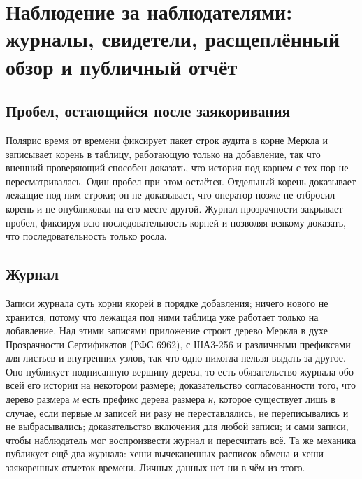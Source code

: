 \section{Наблюдение за наблюдателями: журналы, свидетели, расщеплённый обзор и публичный отчёт}
\label{sec:transparency}



\subsection{Пробел, остающийся после заякоривания}

Полярис время от времени фиксирует пакет строк аудита в корне Меркла и записывает корень в
таблицу, работающую только на добавление, так что внешний проверяющий способен доказать, что
история под корнем с тех пор не пересматривалась. Один пробел при этом остаётся. Отдельный корень
доказывает лежащие под ним строки; он не доказывает, что оператор позже не отбросил корень и не
опубликовал на его месте другой. Журнал прозрачности закрывает пробел, фиксируя всю
последовательность корней и позволяя всякому доказать, что последовательность только росла.
\sImpl

\subsection{Журнал}

Записи журнала суть корни якорей в порядке добавления; ничего нового не хранится, потому что
лежащая под ними таблица уже работает только на добавление. Над этими записями приложение строит
дерево Меркла в духе Прозрачности Сертификатов (РФС 6962), с ША3-256 и различными префиксами для
листьев и внутренних узлов, так что одно никогда нельзя выдать за другое. Оно публикует
подписанную вершину дерева, то есть обязательство журнала обо всей его истории на некотором
размере; доказательство согласованности того, что дерево размера \textit{м} есть префикс дерева размера
\textit{н}, которое существует лишь в случае, если первые \textit{м} записей ни разу не переставлялись, не
переписывались и не выбрасывались; доказательство включения для любой записи; и сами записи, чтобы
наблюдатель мог воспроизвести журнал и пересчитать всё. Та же механика публикует ещё два журнала:
хеши вычеканенных расписок обмена и хеши заякоренных отметок времени. Личных данных нет ни в чём из
этого. \sImpl

